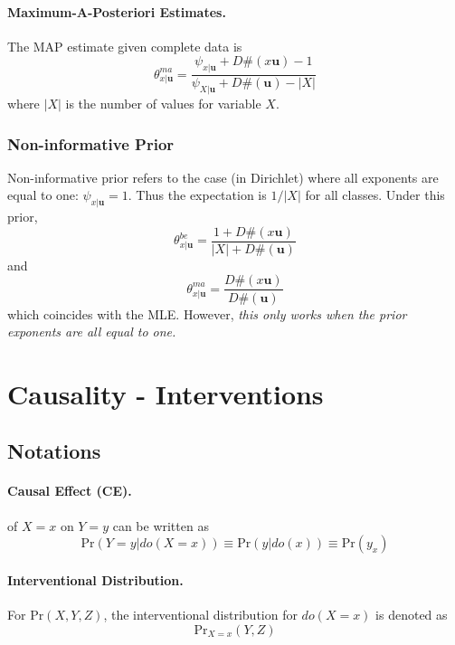 \documentclass[11pt]{article}
\newcommand{\bu}{\mathbf{u}}
\newcommand{\pr}{\mathrm{Pr}}
\begin{document}
\paragraph{Maximum-A-Posteriori Estimates.} The MAP estimate given complete data is 
\begin{equation}
	\theta_{x | \bu}^{ma} = \frac{\psi_{x |\bu} + D\# (x \bu) - 1}{\psi_{X | \bu} + D \# (\bu) - |X|}
\end{equation}
where $|X|$ is the number of values for variable $X$.

\subsubsection{Non-informative Prior} 
Non-informative prior refers to the case (in Dirichlet) where all exponents are equal to one: $\psi_{x | \bu} = 1$. Thus the expectation is $1/|X|$ for all classes. Under this prior, 
\begin{equation}
	\theta^{be}_{x|\bu} = \frac{1 + D\#(x \bu)}{|X| + D \# (\bu)}
\end{equation}
and 
\begin{equation}
	\theta_{x|\bu}^{ma} = \frac{D\#(x \bu)}{D\#(\bu)}
\end{equation}
which coincides with the MLE. However, \textit{this only works when the prior exponents are all equal to one.}


\section{Causality - Interventions}
\subsection{Notations}
\paragraph{Causal Effect (CE).} of $X = x$ on $Y = y$ can be written as
\begin{equation}
	\pr (Y = y | do(X = x)) \equiv \pr (y | do (x)) \equiv \pr(y_x)
\end{equation}

\paragraph{Interventional Distribution.} For $\pr (X, Y, Z)$, the interventional distribution for $do(X = x)$ is denoted as 
\begin{equation}
	\pr _{X = x} (Y, Z)
\end{equation}
\end{document}
